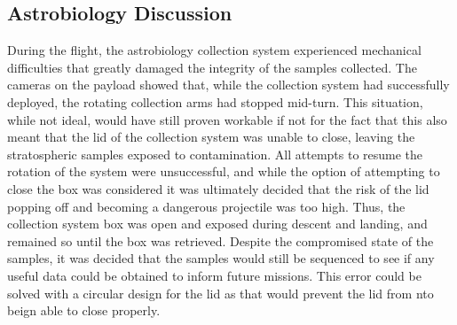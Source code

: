 \subsection{Astrobiology Discussion}
\label{sec:Astrobiology-Discussion}

During the flight, the astrobiology collection system experienced mechanical difficulties that greatly damaged the integrity of the samples collected. The cameras on the payload showed that, while the collection system had successfully deployed, the rotating collection arms had stopped mid-turn. This situation, while not ideal, would have still proven workable if not for the fact that this also meant that the lid of the collection system was unable to close, leaving the stratospheric samples exposed to contamination. All attempts to resume the rotation of the system were unsuccessful, and while the option of attempting to close the box was considered it was ultimately decided that the risk of the lid popping off and becoming a dangerous projectile was too high. Thus, the collection system box was open and exposed during descent and landing, and remained so until the box was retrieved. Despite the compromised state of the samples, it was decided that the samples would still be sequenced to see if any useful data could be obtained to inform future missions. This error could be solved with a circular design for the lid as that would prevent the lid from nto beign able to close properly.
